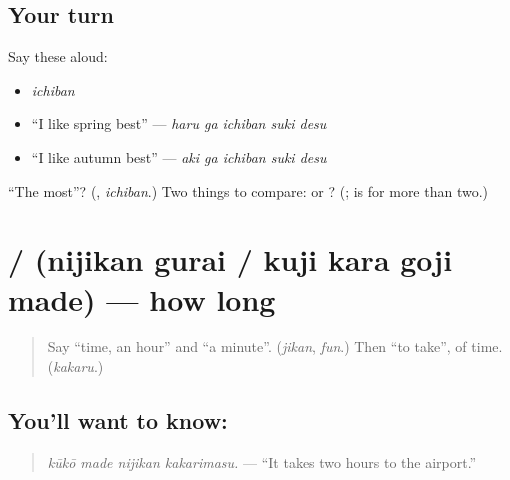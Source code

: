 \subsection*{Your turn}
Say these aloud:

\begin{itemize}
\raggedright
  \item \emph{ichiban}
  \item \textquotedblleft{}I like spring best\textquotedblright{} — \emph{haru ga ichiban suki desu}
  \item \textquotedblleft{}I like autumn best\textquotedblright{} — \emph{aki ga ichiban suki desu}
\end{itemize}

\begin{tcolorbox}[breakable,colback=teal!4,colframe=teal!35!black,title={Before you move on}]
\textquotedblleft{}The most\textquotedblright{}? (\textbf{}, \emph{ichiban}.) Two things to compare: \textbf{} or \textbf{}? (\textbf{}; \textbf{} is for more than two.)
\end{tcolorbox}
\section[\texorpdfstring{\ja{にじかんぐらい} … (nijikan gurai …)}{にじかんぐらい … (nijikan gurai …)}]{ /   (nijikan gurai / kuji kara goji made) — how long}

\label{lesson:JA-C259-nijikan-gurai}



\begin{quote}
Say \textquotedblleft{}time, an hour\textquotedblright{} and \textquotedblleft{}a minute\textquotedblright{}. (\emph{jikan}, \emph{fun}.) Then \textquotedblleft{}to take\textquotedblright{}, of time. (\emph{kakaru}.)
\end{quote}

\subsection*{You'll want to know: }
\begin{quote}
\textbf{  }
\end{quote}

\begin{quote}
\emph{kūkō made nijikan kakarimasu.} — \textquotedblleft{}It takes two hours to the airport.\textquotedblright{}
\end{quote}

